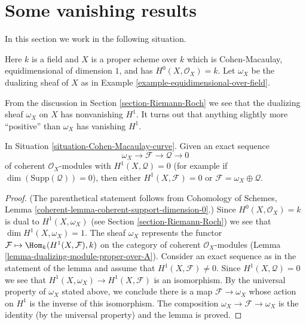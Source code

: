 \section{Some vanishing results}
\label{section-vanishing}

\noindent
In this section we work in the following situation.

\begin{situation}
\label{situation-Cohen-Macaulay-curve}
Here $k$ is a field and $X$ is a proper scheme over $k$ which
is Cohen-Macaulay, equidimensional of dimension $1$, and
has $H^0(X, \mathcal{O}_X) = k$. Let $\omega_X$ be the dualizing
sheaf of $X$ as in Example \ref{example-equidimensional-over-field}.
\end{situation}

\noindent
From the discussion in Section \ref{section-Riemann-Roch} we see that the
dualizing sheaf $\omega_X$ on $X$ has nonvanishing $H^1$. It turns out
that anything slightly more ``positive'' than $\omega_X$ has vanishing $H^1$.

\begin{lemma}
\label{lemma-vanishing}
In Situation \ref{situation-Cohen-Macaulay-curve}. Given an exact sequence
$$
\omega_X \to \mathcal{F} \to \mathcal{Q} \to 0
$$
of coherent $\mathcal{O}_X$-modules with $H^1(X, \mathcal{Q}) = 0$
(for example if $\dim(\text{Supp}(\mathcal{Q})) = 0$), then
either $H^1(X, \mathcal{F}) = 0$ or
$\mathcal{F} = \omega_X \oplus \mathcal{Q}$.
\end{lemma}

\begin{proof}
(The parenthetical statement follows from
Cohomology of Schemes, Lemma \ref{coherent-lemma-coherent-support-dimension-0}.)
Since $H^0(X, \mathcal{O}_X) = k$ is dual to $H^1(X, \omega_X)$
(see Section \ref{section-Riemann-Roch})
we see that $\dim H^1(X, \omega_X) = 1$. The sheaf $\omega_X$
represents the functor
$\mathcal{F} \mapsto \Hom_k(H^1(X, \mathcal{F}), k)$
on the category of coherent $\mathcal{O}_X$-modules
(Lemma \ref{lemma-dualizing-module-proper-over-A}).
Consider an exact sequence as in the statement of the lemma
and assume that $H^1(X, \mathcal{F}) \not = 0$. Since
$H^1(X, \mathcal{Q}) = 0$ we see that
$H^1(X, \omega_X) \to H^1(X, \mathcal{F})$ is an isomorphism.
By the universal property of $\omega_X$ stated above, we conclude there
is a map $\mathcal{F} \to \omega_X$ whose action on $H^1$ is the inverse
of this isomorphism. The composition $\omega_X \to \mathcal{F} \to \omega_X$
is the identity (by the universal property) and the lemma is proved.
\end{proof}


